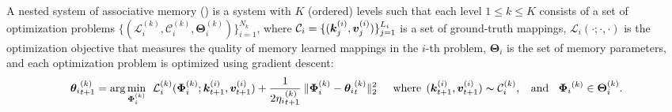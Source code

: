 \begin{dfn} \label{dfn:gnsam}
    A nested system of associative memory (\nsam) is a system with $K$ (ordered) levels such that each level $1 \leq k \leq K$ consists of a set of optimization problems $\{ (\mathcal{L}^{(k)}_{i},  \mathcal{C}^{(k)}_i, \boldsymbol{\Theta}^{(k)}_{i}) \}_{i = 1}^{N_k}$, where $\mathcal{C}_i = \{(\boldsymbol{k}^{(i)}_j, \boldsymbol{v}^{(i)}_j) \}_{j = 1}^{L_{i}}$ is a set of ground-truth mappings, $\mathcal{L}_{i}(\cdot; \cdot, \cdot)$ is the optimization objective that measures the quality of memory learned mappings in the $i$-th problem, $\boldsymbol{\Theta}_{i}$ is the set of memory parameters, and each optimization problem is optimized using gradient descent:
    \begin{align}
        {\boldsymbol{\theta}_{i}}^{(k)}_{t+1} = \arg\min_{\boldsymbol{\Phi}^{(k)}_{i}} \:\:  \mathcal{L}^{(k)}_i(\boldsymbol{\Phi}^{(k)}_{i}; \boldsymbol{k}^{(i)}_{t+1}, \boldsymbol{v}^{(i)}_{t+1}) + \frac{1}{2{\eta_{i}}^{(k)}_{t+1}}\:\|\boldsymbol{\Phi}^{(k)}_{i} - {\boldsymbol{\theta}_{i}}^{(k)}_{t} \|^{2}_2 \quad \:\: \text{where}\:\: (\boldsymbol{k}^{(i)}_{t+1}, \boldsymbol{v}^{(i)}_{t+1}) \thicksim \mathcal{C}^{(k)}_i, \:\:\:\: \text{and} \:\:\: \:{\boldsymbol{\Phi}_{i}}^{(k)} \in  \boldsymbol{\Theta}^{(k)}_{i}.
    \end{align}
\end{dfn} 









